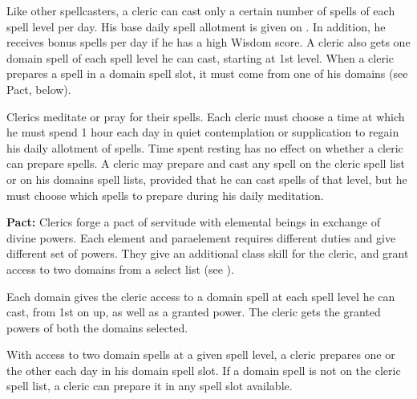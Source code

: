 Like other spellcasters, a cleric can cast only a certain number of spells of each spell level per day. His base daily spell allotment is given on . In addition, he receives bonus spells per day if he has a high Wisdom score. A cleric also gets one domain spell of each spell level he can cast, starting at 1st level. When a cleric prepares a spell in a domain spell slot, it must come from one of his domains (see Pact, below).

Clerics meditate or pray for their spells. Each cleric must choose a time at which he must spend 1 hour each day in quiet contemplation or supplication to regain his daily allotment of spells. Time spent resting has no effect on whether a cleric can prepare spells. A cleric may prepare and cast any spell on the cleric spell list or on his domains spell lists, provided that he can cast spells of that level, but he must choose which spells to prepare during his daily meditation.




\textbf{Pact:} Clerics forge a pact of servitude with elemental beings in exchange of divine powers. Each element and paraelement requires different duties and give different set of powers. They give an additional class skill for the cleric, and grant access to two domains from a select list (see ).

Each domain gives the cleric access to a domain spell at each spell level he can cast, from 1st on up, as well as a granted power. The cleric gets the granted powers of both the domains selected.

With access to two domain spells at a given spell level, a cleric prepares one or the other each day in his domain spell slot. If a domain spell is not on the cleric spell list, a cleric can prepare it in any spell slot available. %

